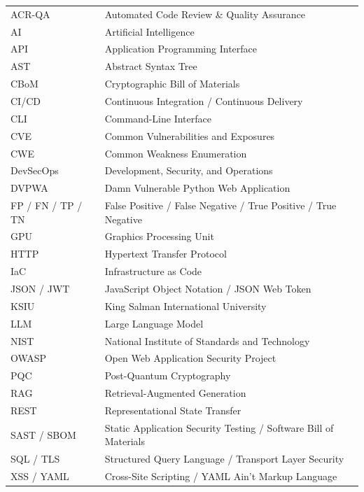 {\begin{longtable}{@{} p{3.2cm} p{10.2cm} @{}}
ACR-QA     & Automated Code Review \& Quality Assurance \\[3pt]
AI         & Artificial Intelligence \\[3pt]
API        & Application Programming Interface \\[3pt]
AST        & Abstract Syntax Tree \\[3pt]
CBoM       & Cryptographic Bill of Materials \\[3pt]
CI/CD      & Continuous Integration / Continuous Delivery \\[3pt]
CLI        & Command-Line Interface \\[3pt]
CVE        & Common Vulnerabilities and Exposures \\[3pt]
CWE        & Common Weakness Enumeration \\[3pt]
DevSecOps  & Development, Security, and Operations \\[3pt]
DVPWA      & Damn Vulnerable Python Web Application \\[3pt]
FP / FN / TP / TN & False Positive / False Negative / True Positive / True Negative \\[3pt]
GPU        & Graphics Processing Unit \\[3pt]
HTTP       & Hypertext Transfer Protocol \\[3pt]
IaC        & Infrastructure as Code \\[3pt]
JSON / JWT & JavaScript Object Notation / JSON Web Token \\[3pt]
KSIU       & King Salman International University \\[3pt]
LLM        & Large Language Model \\[3pt]
NIST       & National Institute of Standards and Technology \\[3pt]
OWASP      & Open Web Application Security Project \\[3pt]
PQC        & Post-Quantum Cryptography \\[3pt]
RAG        & Retrieval-Augmented Generation \\[3pt]
REST       & Representational State Transfer \\[3pt]
SAST / SBOM & Static Application Security Testing / Software Bill of Materials \\[3pt]
SQL / TLS  & Structured Query Language / Transport Layer Security \\[3pt]
XSS / YAML & Cross-Site Scripting / YAML Ain't Markup Language \\[3pt]


\end{longtable}}
